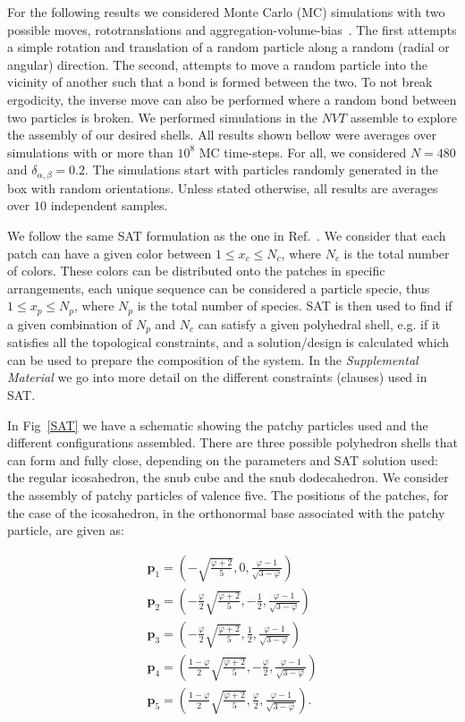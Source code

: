 \documentclass[a4paper, amsfonts, amssymb, amsmath, reprint, showkeys, nofootinbib, oneside]{revtex4-1}
\begin{document}
For the following results we considered Monte Carlo (MC) simulations with two possible moves, rototranslations and aggregation-volume-bias~\cite{Rovigatti2018}. The first attempts a simple rotation and translation of a random particle along a random (radial or angular) direction. The second, attempts to move a random particle into the vicinity of another such that a bond is formed between the two. To not break ergodicity, the inverse move can also be performed where a random bond between two particles is broken. We performed simulations in the $NVT$ assemble to explore the assembly of our desired shells. All results shown bellow were averages over simulations with or more than $10^8$ MC time-steps. For all, we considered $N=480$ and $\delta_{\alpha, \beta}=0.2$. The simulations start with particles randomly generated in the box with random orientations. Unless stated otherwise, all results are averages over $10$ independent samples.

We follow the same SAT formulation as the one in Ref.~\cite{Russo2022}. We consider that each patch can have a given color between $1\leq x_c\leq N_c$, where $N_c$ is the total number of colors. These colors can be distributed onto the patches in specific arrangements, each unique sequence can be considered a particle specie, thus $1\leq x_p\leq N_p$, where $N_p$ is the total number of species. SAT is then used to find if a given combination of $N_p$ and $N_c$ can satisfy a given polyhedral shell, e.g. if it satisfies all the topological constraints, and a solution/design is calculated which can be used to prepare the composition of the system. In the \emph{Supplemental Material} we go into more detail on the different constraints (clauses) used in SAT.

In Fig~\ref{SAT} we have a schematic showing the patchy particles used and the different configurations assembled. There are three possible polyhedron shells that can form and fully close, depending on the parameters and SAT solution used: the regular icosahedron, the snub cube and the snub dodecahedron. We consider the assembly of patchy particles of valence five. The positions of the patches, for the case of the icosahedron, in the orthonormal base associated with the patchy particle, are given as:

\begin{equation}
    \label{patch}
    \begin{aligned}
    \textbf{p}_1=(-\sqrt{\frac{\varphi+2}{5}}, 0, \frac{\varphi-1}{\sqrt{3-\varphi}}) \\
    \textbf{p}_2=(-\frac{\varphi}{2}\sqrt{\frac{\varphi+2}{5}}, -\frac{1}{2}, \frac{\varphi-1}{\sqrt{3-\varphi}}) \\
    \textbf{p}_3=(-\frac{\varphi}{2}\sqrt{\frac{\varphi+2}{5}}, \frac{1}{2}, \frac{\varphi-1}{\sqrt{3-\varphi}}) \\ 
    \textbf{p}_4=(\frac{1-\varphi}{2}\sqrt{\frac{\varphi+2}{5}}, -\frac{\varphi}{2}, \frac{\varphi-1}{\sqrt{3-\varphi}}) \\
    \textbf{p}_5=(\frac{1-\varphi}{2}\sqrt{\frac{\varphi+2}{5}}, \frac{\varphi}{2}, \frac{\varphi-1}{\sqrt{3-\varphi}}) .
    \end{aligned}
\end{equation}
\end{document}
